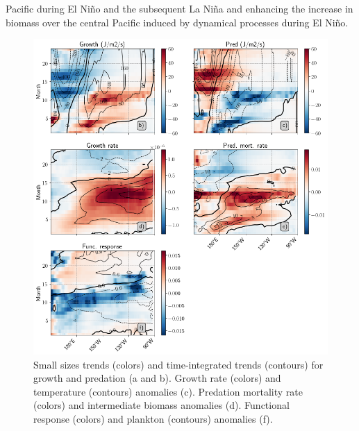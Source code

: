 Pacific during El Niño and the subsequent La Niña and enhancing the increase in biomass over the central Pacific induced by dynamical processes during El Niño.  

\begin{figure}[h!tp]
	\centering
	\includegraphics[scale=0.4]{figs/fig8.png}	
	\caption{Small sizes trends (colors) and time-integrated trends (contours) for growth and predation (a and b). Growth rate (colors) and temperature (contours) anomalies (c). Predation mortality rate (colors) and intermediate biomass anomalies (d). Functional response (colors) and plankton (contours) anomalies (f).}
	\label{fig:fig8}
\end{figure}

